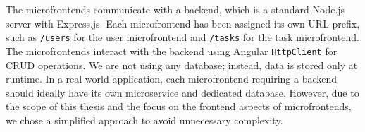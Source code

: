 \noindent
The microfrontends communicate with a backend, which is a standard Node.js server with Express.js. Each microfrontend has been assigned its own URL prefix, such as \texttt{/users} for the user microfrontend and \texttt{/tasks} for the task microfrontend. The microfrontends interact with the backend using Angular \texttt{HttpClient} for CRUD operations. We are not using any database; instead, data is stored only at runtime. In a real-world application, each microfrontend requiring a backend should ideally have its own microservice and dedicated database. However, due to the scope of this thesis and the focus on the frontend aspects of microfrontends, we chose a simplified approach to avoid unnecessary complexity.